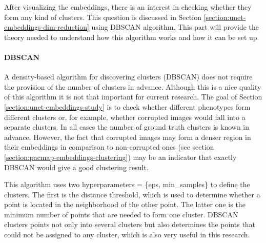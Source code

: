 After visualizing the embeddings, there is an interest in checking whether they form any kind of clusters. This question is discussed in Section \ref{section:unet-embeddings-dim-reduction} using DBSCAN algorithm. This part will provide the theory needed to understand how this algorithm works and how it can be set up.
\paragraph{DBSCAN}
\label{section:dbscan}
A density-based algorithm for discovering clusters (DBSCAN) does not require the provision of the number of clusters in advance. Although this is a nice quality of this algorithm it is not that important for current research. The goal of Section \ref{section:unet-embeddings-study} is to check whether different phenotypes form different clusters or, for example, whether corrupted images would fall into a separate clusters. In all cases the number of ground truth clusters is known in advance. However, the fact that corrupted images may form a denser region in their embeddings in comparison to non-corrupted ones (see section \ref{section:pacmap-embeddings-clustering}) may be an indicator that exactly DBSCAN would give a good clustering result. 

This algorithm uses two hyperparameters = \{eps, min\_samples\} to define the clusters. The first is the distance threshold, which is used to determine whether a point is located in the neighborhood of the other point. The latter one is the minimum number of points that are needed to form one cluster. DBSCAN clusters points not only into several clusters but also determines the points that could not be assigned to any cluster, which is also very useful in this research.